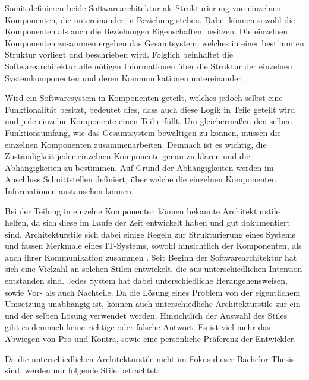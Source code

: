 Somit definieren beide Softwarearchitektur als Strukturierung von einzelnen Komponenten, die untereinander in Beziehung stehen. Dabei können sowohl die Komponenten als auch die Beziehungen Eigenschaften besitzen. Die einzelnen Komponenten zusammen ergeben das Gesamtsystem, welches in einer bestimmten Struktur vorliegt und beschrieben wird. Folglich beinhaltet die Softwarearchitektur alle nötigen Informationen über die Struktur der einzelnen Systemkomponenten und deren Kommunikationen untereinander.



Wird ein Softwaresystem in Komponenten geteilt, welches jedoch selbst eine Funktionalität besitzt, bedeutet dies, dass auch diese Logik in Teile geteilt wird und jede einzelne Komponente einen Teil erfüllt. Um gleichermaßen den selben Funktionsumfang, wie das Gesamtsystem bewältigen zu können, müssen die einzelnen Komponenten zusammenarbeiten. Demnach ist es wichtig, die Zuständigkeit jeder einzelnen Komponente genau zu klären und die Abhängigkeiten zu bestimmen. Auf Grund der Abhängigkeiten werden im Anschluss Schnittstellen definiert, über welche die einzelnen Komponenten Informationen austauschen können.

Bei der Teilung in einzelne Komponenten können bekannte Architekturstile helfen, da sich diese im Laufe der Zeit entwickelt haben und gut dokumentiert sind. Architekturstile sich dabei einige Regeln zur Strukturierung eines Systems und fassen Merkmale eines IT-Systems, sowohl hinsichtlich der Komponenten, als auch ihrer Kommunikation zusammen \parencite[vlg.][S. 102]{starke_effektive_2015}. Seit Beginn der Softwarearchitektur hat sich eine Vielzahl an solchen Stilen entwickelt, die aus unterschiedlichen Intention entstanden sind. Jedes System hat dabei unterschiedliche Herangehensweisen, sowie Vor- als auch Nachteile. Da die Lösung eines Problem von der eigentlichem Umsetzung unabhängig ist, können auch unterschiedliche Architekturstile zur ein und der selben Lösung verwendet werden. Hinsichtlich der Auswahl des Stiles gibt es demnach keine richtige oder falsche Antwort. Es ist viel mehr das Abwiegen von Pro und Kontra, sowie eine persönliche Präferenz der Entwickler.

Da die unterschiedlichen Architekturstile nicht im  Fokus dieser Bachelor Thesis sind, werden nur folgende Stile betrachtet:

